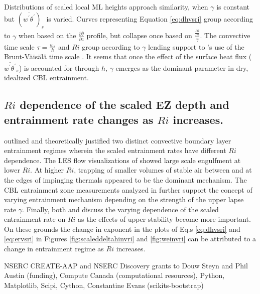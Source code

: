 \documentclass[referee]{svjour3}
\begin{document}
Distributions of scaled local ML heights approach similarity, when $\gamma$ is constant but $(\overline{w^{'}\theta^{'}})_{s}$ is varied.  Curves representing Equation \ref{eq:dhvsri} group according to $\gamma$ when based on the $\frac{\partial \overline{\theta}}{\partial z}$ profile, but collapse once based on $\frac{\frac{\partial \overline{\theta}}{\partial z}}{\gamma}$.  The convective time scale $\tau = \frac{w_{*}}{h}$ and $Ri$ group according to $\gamma$ lending support to \cite{FedConzMir04}'s use of the Brunt-V{\"a}is{\"a}l{\"a} time scale \citep{NChap14}.  It seems that once the effect of the surface heat flux ($\overline{w^{'}\theta^{'}}_{s}$) is accounted for through $h$, $\gamma$ emerges as the dominant parameter in dry, idealized CBL entrainment.\\
 
\subsection{$Ri$ dependence of the scaled EZ depth and entrainment rate changes as $Ri$ increases.}

\cite{Turner86} outlined and theoretically justified two distinct convective boundary layer entrainment regimes wherein the scaled entrainment rates have different $Ri$ dependence. The LES flow visualizations of \cite{SullMoengStev} showed large scale engulfment at lower $Ri$.  At higher $Ri$, trapping of smaller volumes of stable air between and at the edges of impinging thermals appeared to be the dominant mechanism. The CBL entrainment zone measurements analyzed in \cite{Traum11} further support the concept of varying entrainment mechanism depending on the strength of the upper lapse rate $\gamma$.  Finally, both \cite{FedConzMir04} and \cite{GarciaMellado} discuss the varying dependence of the scaled entrainment rate on $Ri$ as the effects of upper stability become more important.  On these grounds the change in exponent in the plots of Eq.s \ref{eq:dhvsri} and \ref{eq:ervsri} in Figures \ref{fig:scaleddeltahinvri} and \ref{fig:weinvri} can be attributed to a change in entrainment regime as $Ri$ increases.   



\begin{acknowledgements}
NSERC CREATE-AAP and NSERC Discovery grants to Douw Steyn and Phil Austin (funding), Compute Canada (computational resources), Python, Matplotlib, Scipi, Cython, Constantine Evans (scikits-bootstrap) 
\end{acknowledgements}


\end{document}
